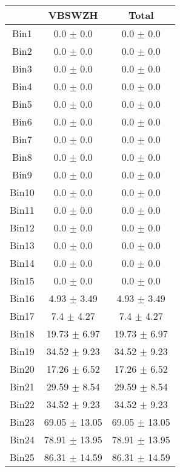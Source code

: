   \begin{tabular}{|c|c|c|}
  \hline
      & VBSWZH & Total \\ \cline{1-3} 
     \hline\hline
     Bin1 & 0.0 $\pm$ 0.0 & 0.0 $\pm$ 0.0 \\ \cline{1-3} 
     Bin2 & 0.0 $\pm$ 0.0 & 0.0 $\pm$ 0.0 \\ \cline{1-3} 
     Bin3 & 0.0 $\pm$ 0.0 & 0.0 $\pm$ 0.0 \\ \cline{1-3} 
     Bin4 & 0.0 $\pm$ 0.0 & 0.0 $\pm$ 0.0 \\ \cline{1-3} 
     Bin5 & 0.0 $\pm$ 0.0 & 0.0 $\pm$ 0.0 \\ \cline{1-3} 
     Bin6 & 0.0 $\pm$ 0.0 & 0.0 $\pm$ 0.0 \\ \cline{1-3} 
     Bin7 & 0.0 $\pm$ 0.0 & 0.0 $\pm$ 0.0 \\ \cline{1-3} 
     Bin8 & 0.0 $\pm$ 0.0 & 0.0 $\pm$ 0.0 \\ \cline{1-3} 
     Bin9 & 0.0 $\pm$ 0.0 & 0.0 $\pm$ 0.0 \\ \cline{1-3} 
     Bin10 & 0.0 $\pm$ 0.0 & 0.0 $\pm$ 0.0 \\ \cline{1-3} 
     Bin11 & 0.0 $\pm$ 0.0 & 0.0 $\pm$ 0.0 \\ \cline{1-3} 
     Bin12 & 0.0 $\pm$ 0.0 & 0.0 $\pm$ 0.0 \\ \cline{1-3} 
     Bin13 & 0.0 $\pm$ 0.0 & 0.0 $\pm$ 0.0 \\ \cline{1-3} 
     Bin14 & 0.0 $\pm$ 0.0 & 0.0 $\pm$ 0.0 \\ \cline{1-3} 
     Bin15 & 0.0 $\pm$ 0.0 & 0.0 $\pm$ 0.0 \\ \cline{1-3} 
     Bin16 & 4.93 $\pm$ 3.49 & 4.93 $\pm$ 3.49 \\ \cline{1-3} 
     Bin17 & 7.4 $\pm$ 4.27 & 7.4 $\pm$ 4.27 \\ \cline{1-3} 
     Bin18 & 19.73 $\pm$ 6.97 & 19.73 $\pm$ 6.97 \\ \cline{1-3} 
     Bin19 & 34.52 $\pm$ 9.23 & 34.52 $\pm$ 9.23 \\ \cline{1-3} 
     Bin20 & 17.26 $\pm$ 6.52 & 17.26 $\pm$ 6.52 \\ \cline{1-3} 
     Bin21 & 29.59 $\pm$ 8.54 & 29.59 $\pm$ 8.54 \\ \cline{1-3} 
     Bin22 & 34.52 $\pm$ 9.23 & 34.52 $\pm$ 9.23 \\ \cline{1-3} 
     Bin23 & 69.05 $\pm$ 13.05 & 69.05 $\pm$ 13.05 \\ \cline{1-3} 
     Bin24 & 78.91 $\pm$ 13.95 & 78.91 $\pm$ 13.95 \\ \cline{1-3} 
     Bin25 & 86.31 $\pm$ 14.59 & 86.31 $\pm$ 14.59 \\ \cline{1-3} 

\end{tabular}
